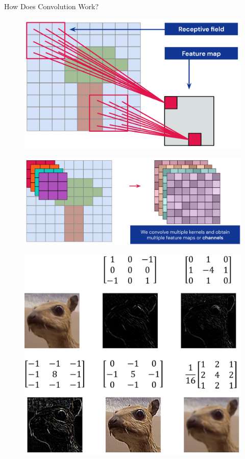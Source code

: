 \begin{frame}[allowframebreaks]{How Does Convolution Work?}
\begin{figure}
\centering
\includegraphics[width=1.0\textwidth,height=0.9\textheight,keepaspectratio]{images/cnn/conv_10.png}
\end{figure}

\framebreak

\begin{figure}
\centering
\includegraphics[width=1.0\textwidth,height=0.9\textheight,keepaspectratio]{images/cnn/conv_11.png}
\end{figure}

\framebreak

\begin{figure}
\centering
\includegraphics[width=1.0\textwidth,height=0.9\textheight,keepaspectratio]{images/cnn/conv_12.png}
\end{figure}

\end{frame}
